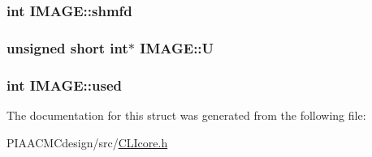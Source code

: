 \hypertarget{structIMAGE_aa1de16f9b739720f6de65389f63d8229}{
\subsubsection[{shmfd}]{\setlength{\rightskip}{0pt plus 5cm}int I\+M\+A\+G\+E\+::shmfd}}\label{structIMAGE_aa1de16f9b739720f6de65389f63d8229}
\hypertarget{structIMAGE_a0e75d3dd1879fa0d0fa9caaa80a1074a}{
\subsubsection[{U}]{\setlength{\rightskip}{0pt plus 5cm}unsigned short int$\ast$ I\+M\+A\+G\+E\+::\+U}}\label{structIMAGE_a0e75d3dd1879fa0d0fa9caaa80a1074a}
\hypertarget{structIMAGE_aca4f71f11b37d19c782813e3be7dee49}{
\subsubsection[{used}]{\setlength{\rightskip}{0pt plus 5cm}int I\+M\+A\+G\+E\+::used}}\label{structIMAGE_aca4f71f11b37d19c782813e3be7dee49}


The documentation for this struct was generated from the following file\+:\begin{DoxyCompactItemize}
\item 
P\+I\+A\+A\+C\+M\+Cdesign/src/\hyperlink{PIAACMCdesign_2src_2CLIcore_8h}{C\+L\+Icore.\+h}\end{DoxyCompactItemize}
